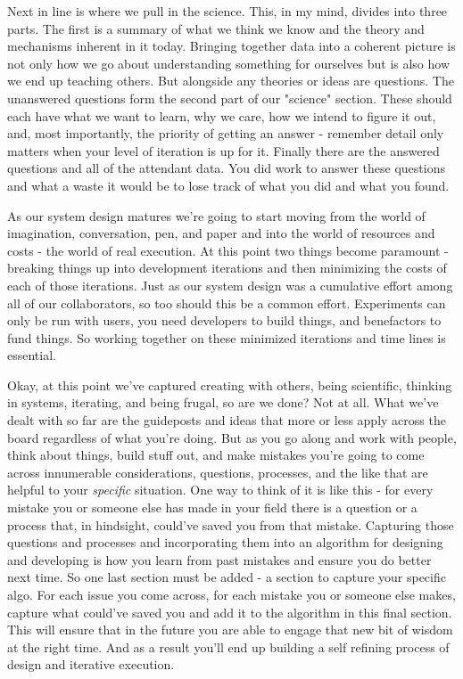 \documentclass[11pt,a5paper]{book}
\begin{document}
Next in line is where we pull in the science. This, in my mind, divides into three parts. The first is a summary of what we think we know and the theory and mechanisms inherent in it today. Bringing together data into a coherent picture is not only how we go about understanding something for ourselves but is also how we end up teaching others. But alongside any theories or ideas are questions. The unanswered questions form the second part of our "science" section. These should each have what we want to learn, why we care, how we intend to figure it out, and, most importantly, the priority of getting an answer - remember detail only matters when your level of iteration is up for it. Finally there are the answered questions and all of the attendant data. You did work to answer these questions and what a waste it would be to lose track of what you did and what you found.
\newline

As our system design matures we're going to start moving from the world of imagination, conversation, pen, and paper and into the world of resources and costs - the world of real execution. At this point two things become paramount - breaking things up into development iterations and then minimizing the costs of each of those iterations. Just as our system design was a cumulative effort among all of our collaborators, so too should this be a common effort. Experiments can only be run with users, you need developers to build things, and benefactors to fund things. So working together on these minimized iterations and time lines is essential.
\newline

Okay, at this point we've captured creating with others, being scientific, thinking in systems, iterating, and being frugal, so are we done? Not at all. What we've dealt with so far are the guideposts and ideas that more or less apply across the board regardless of what you're doing. But as you go along and work with people, think about things, build stuff out, and make mistakes you're going to come across innumerable considerations, questions, processes, and the like that are helpful to your \textit{specific} situation. One way to think of it is like this - for every mistake you or someone else has made in your field there is a question or a process that, in hindsight, could've saved you from that mistake. Capturing those questions and processes and incorporating them into an algorithm for designing and developing is how you learn from past mistakes and ensure you do better next time. So one last section must be added - a section to capture your specific algo. For each issue you come across, for each mistake you or someone else makes, capture what could've saved you and add it to the algorithm in this final section. This will ensure that in the future you are able to engage that new bit of wisdom at the right time. And as a result you'll end up building a self refining process of design and iterative execution.
\newline
\end{document}
